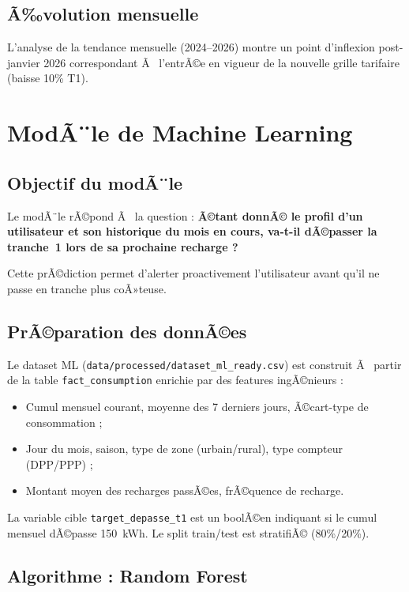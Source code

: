 \documentclass[12pt,a4paper]{report}
\begin{document}
\subsection{Ã‰volution mensuelle}

L'analyse de la tendance mensuelle (2024--2026) montre un point d'inflexion post-janvier 2026 correspondant Ã  l'entrÃ©e en vigueur de la nouvelle grille tarifaire (baisse 10\% T1).

\section{ModÃ¨le de Machine Learning}

\subsection{Objectif du modÃ¨le}

Le modÃ¨le rÃ©pond Ã  la question : \textbf{Ã©tant donnÃ© le profil d'un utilisateur et son historique du mois en cours, va-t-il dÃ©passer la tranche~1 lors de sa prochaine recharge ?}

Cette prÃ©diction permet d'alerter proactivement l'utilisateur avant qu'il ne passe en tranche plus coÃ»teuse.

\subsection{PrÃ©paration des donnÃ©es}

Le dataset ML (\texttt{data/processed/dataset\_ml\_ready.csv}) est construit Ã  partir de la table \texttt{fact\_consumption} enrichie par des features ingÃ©nieurs :

\begin{itemize}
  \item Cumul mensuel courant, moyenne des 7 derniers jours, Ã©cart-type de consommation ;
  \item Jour du mois, saison, type de zone (urbain/rural), type compteur (DPP/PPP) ;
  \item Montant moyen des recharges passÃ©es, frÃ©quence de recharge.
\end{itemize}

La variable cible \texttt{target\_depasse\_t1} est un boolÃ©en indiquant si le cumul mensuel dÃ©passe 150~kWh. Le split train/test est stratifiÃ© (80\%/20\%).

\subsection{Algorithme : Random Forest}
\end{document}
